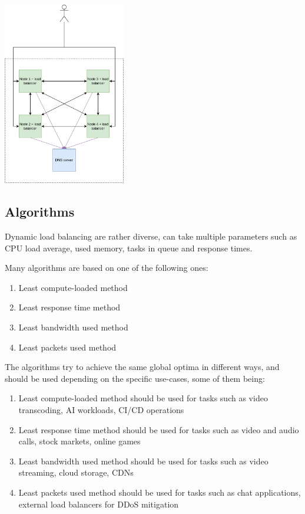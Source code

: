 \documentclass[conference]{IEEEtran}
\begin{document}
    \begin{center}
        \vspace{1em}
        \includegraphics[width=0.4\textwidth]{decentralised-load-balanced-system.png}
         \label{decentralised-load-balanced-system}
        \vspace{1em}
    \end{center}

\subsection{Algorithms}
    Dynamic load balancing are rather diverse, can take multiple parameters such as CPU load average, used memory, tasks in
queue and response times.

    Many algorithms are based on one of the following ones:

    \begin{enumerate}
        \item Least compute-loaded method
        \item Least response time method
        \item Least bandwidth used method
        \item Least packets used method
    \end{enumerate}

    The algorithms try to achieve the same global optima in different ways, and should be used depending on the specific
use-cases, some of them being:

    \begin{enumerate}
        \item Least compute-loaded method should be used for tasks such as video transcoding, AI workloads, CI/CD operations
        \item Least response time method should be used for tasks such as video and audio calls, stock markets, online games
        \item Least bandwidth used method should be used for tasks such as video streaming, cloud storage, CDNs
        \item Least packets used method should be used for tasks such as chat applications, external load balancers for DDoS mitigation
    \end{enumerate}
\end{document}
